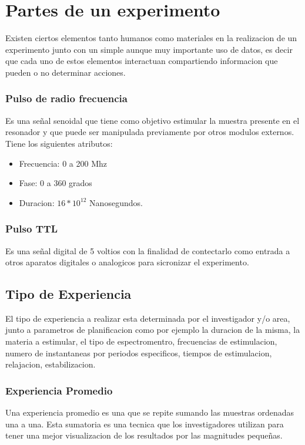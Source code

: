 \section{Partes de un experimento}

Existen ciertos elementos tanto humanos como materiales en la realizacion de un experimento junto con un 
simple aunque muy importante uso de datos, es decir que cada uno de estos elementos interactuan compartiendo
informacion que pueden o no determinar acciones.

\subsubsection{Pulso de radio frecuencia}
Es una señal senoidal que tiene como objetivo
estimular la muestra presente en el resonador
y que puede ser manipulada previamente
por otros modulos externos. Tiene los siguientes atributos:
    \begin{itemize}
        \item Frecuencia: 0 a 200 Mhz
        \item Fase: 0 a 360 grados
        \item Duracion: $16*10^{12}$ Nanosegundos.
    \end{itemize}

\subsubsection{Pulso TTL}
Es una señal digital de 5 voltios con la finalidad de contectarlo como entrada a otros aparatos digitales o analogicos para sicronizar el experimento.

\subsection{Tipo de Experiencia}
El tipo de experiencia a realizar esta determinada por el investigador y/o area, junto a parametros de planificacion
como por ejemplo la duracion de la misma, la materia a estimular, el tipo de espectromentro, frecuencias
de estimulacion, numero de instantaneas por periodos especificos, tiempos de estimulacion, relajacion, estabilizacion.

\subsubsection{Experiencia Promedio}
Una experiencia promedio es una que se repite sumando las muestras ordenadas una a una. Esta sumatoria es una tecnica que los investigadores utilizan para tener una mejor visualizacion de los
resultados por las magnitudes pequeñas.

